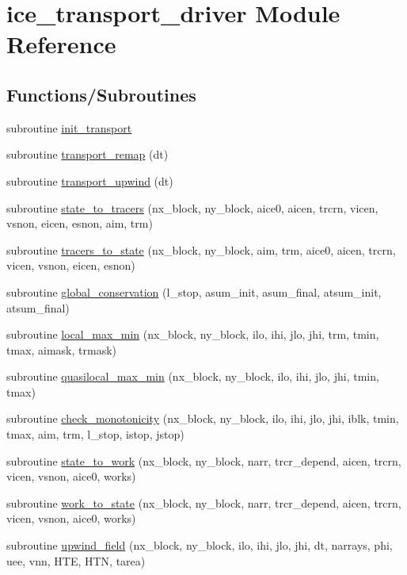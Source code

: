 \hypertarget{namespaceice__transport__driver}{
\section{ice\_\-transport\_\-driver Module Reference}
\label{namespaceice__transport__driver}
}
\subsection*{Functions/Subroutines}
\begin{DoxyCompactItemize}
\item 
subroutine \hyperlink{namespaceice__transport__driver_a47d0afada16dff37da3f72fa4c27ef86}{init\_\-transport}
\item 
subroutine \hyperlink{namespaceice__transport__driver_aaca5fc744c83b022ee5b5117300cbe8c}{transport\_\-remap} (dt)
\item 
subroutine \hyperlink{namespaceice__transport__driver_ac2fc3fdbf27d4f17ac32c18011940121}{transport\_\-upwind} (dt)
\item 
subroutine \hyperlink{namespaceice__transport__driver_a9820a25e1c9c417a464cd9127254edab}{state\_\-to\_\-tracers} (nx\_\-block, ny\_\-block, aice0, aicen, trcrn, vicen, vsnon, eicen, esnon, aim, trm)
\item 
subroutine \hyperlink{namespaceice__transport__driver_a4f5b07efec9e5b90aca1c9c43c06ba4d}{tracers\_\-to\_\-state} (nx\_\-block, ny\_\-block, aim, trm, aice0, aicen, trcrn, vicen, vsnon, eicen, esnon)
\item 
subroutine \hyperlink{namespaceice__transport__driver_aa19bcb5dc77f4adee16ba36fc1f9e3b5}{global\_\-conservation} (l\_\-stop, asum\_\-init, asum\_\-final, atsum\_\-init, atsum\_\-final)
\item 
subroutine \hyperlink{namespaceice__transport__driver_a1454e3a5f9bdaec16216269fabe0c5b4}{local\_\-max\_\-min} (nx\_\-block, ny\_\-block, ilo, ihi, jlo, jhi, trm, tmin, tmax, aimask, trmask)
\item 
subroutine \hyperlink{namespaceice__transport__driver_a67ed05a8905e21d57703a31ede8ead61}{quasilocal\_\-max\_\-min} (nx\_\-block, ny\_\-block, ilo, ihi, jlo, jhi, tmin, tmax)
\item 
subroutine \hyperlink{namespaceice__transport__driver_a21179a91327fdb3bd51d2e7b5e3b170d}{check\_\-monotonicity} (nx\_\-block, ny\_\-block, ilo, ihi, jlo, jhi, iblk, tmin, tmax, aim, trm, l\_\-stop, istop, jstop)
\item 
subroutine \hyperlink{namespaceice__transport__driver_a922d3b29eea0cadb79c280ead41215ba}{state\_\-to\_\-work} (nx\_\-block, ny\_\-block, narr, trcr\_\-depend, aicen, trcrn, vicen, vsnon, aice0, works)
\item 
subroutine \hyperlink{namespaceice__transport__driver_a20f15deea681c348f6f2032c7db58c50}{work\_\-to\_\-state} (nx\_\-block, ny\_\-block, narr, trcr\_\-depend, aicen, trcrn, vicen, vsnon, aice0, works)
\item 
subroutine \hyperlink{namespaceice__transport__driver_acb90f49777dc049ce780454b1165ed0a}{upwind\_\-field} (nx\_\-block, ny\_\-block, ilo, ihi, jlo, jhi, dt, narrays, phi, uee, vnn, HTE, HTN, tarea)
\end{DoxyCompactItemize}
